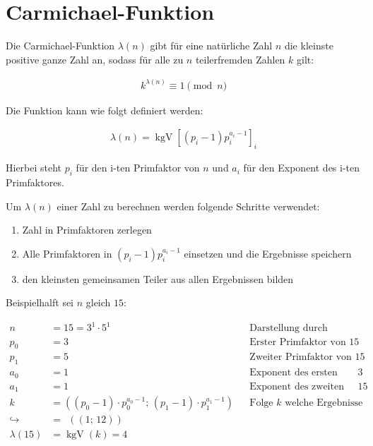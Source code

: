 \section{Carmichael-Funktion}

Die Carmichael-Funktion $\lambda(n)$ gibt für eine natürliche Zahl $n$ die kleinste positive ganze Zahl an, sodass für alle zu $n$ teilerfremden Zahlen $k$ gilt:

\begin{align}
  k^{\lambda(n)} \equiv 1\pmod{n}
\end{align}

Die Funktion kann wie folgt definiert werden:

\begin{align}
  \lambda(n) = \operatorname{kgV}\left[(p_i-1)p_i^{a_i-1}\right]_i
\end{align}\cite{mw04}

Hierbei steht $p_i$ für den i-ten Primfaktor von $n$ und $a_i$ für den Exponent des i-ten Primfaktores.\cite{mw05}

Um $\lambda(n)$ einer Zahl zu berechnen werden folgende Schritte verwendet:

\begin{enumerate}
  \item Zahl in Primfaktoren zerlegen
  \item Alle Primfaktoren in $(p_i-1)p_i^{a_i-1}$ einsetzen und die Ergebnisse speichern
  \item den kleinsten gemeinsamen Teiler aus allen Ergebnissen bilden
\end{enumerate}

Beispielhalft sei $n$ gleich $15$:

\begin{equation}
  \begin{aligned}
    n&=15=3^1 \cdot 5^1 && \text{Darstellung durch Primfaktoren}\\
    p_0&=3 && \text{Erster Primfaktor von $15$}\\
    p_1&=5 && \text{Zweiter Primfaktor von $15$}\\
    a_0&=1 && \text{Exponent des ersten Primfaktors $3$}\\
    a_1&=1 && \text{Exponent des zweiten Primfaktors $15$}\\
    k&=\left((p_0 - 1) \cdot p_0^{a_0 - 1};\, (p_1 - 1) \cdot p_1^{a_1 - 1}\right) && \text{Folge $k$ welche Ergebnisse enthält}\\
    \hookrightarrow&=\;\,((1;\, 12))\\
    \lambda(15)&=\operatorname{kgV}(k)=4
  \end{aligned}
\end{equation}

